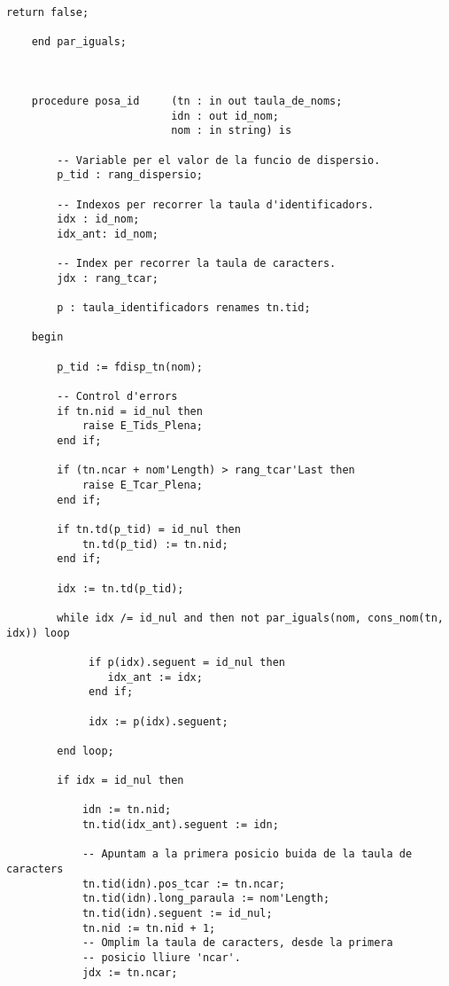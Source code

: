 \documentclass[10pt]{report}
\begin{document}
\begin{lstlisting}[style=Ada]
        return false;
    
    end par_iguals;
        


    procedure posa_id     (tn : in out taula_de_noms; 
                          idn : out id_nom; 
                          nom : in string) is
        
        -- Variable per el valor de la funcio de dispersio.
        p_tid : rang_dispersio;
        
        -- Indexos per recorrer la taula d'identificadors.
        idx : id_nom;
        idx_ant: id_nom; 
        
        -- Index per recorrer la taula de caracters.
        jdx : rang_tcar; 
        
        p : taula_identificadors renames tn.tid;
        
    begin
    
        p_tid := fdisp_tn(nom);
        
        -- Control d'errors
        if tn.nid = id_nul then
            raise E_Tids_Plena;
        end if;
        
        if (tn.ncar + nom'Length) > rang_tcar'Last then
            raise E_Tcar_Plena;
        end if;

        if tn.td(p_tid) = id_nul then
            tn.td(p_tid) := tn.nid;
        end if;
        
        idx := tn.td(p_tid);

        while idx /= id_nul and then not par_iguals(nom, cons_nom(tn, idx)) loop
             
             if p(idx).seguent = id_nul then
                idx_ant := idx;
             end if;
             
             idx := p(idx).seguent;     
            
        end loop;
        
        if idx = id_nul then

            idn := tn.nid;
            tn.tid(idx_ant).seguent := idn;
            
            -- Apuntam a la primera posicio buida de la taula de caracters
            tn.tid(idn).pos_tcar := tn.ncar; 
            tn.tid(idn).long_paraula := nom'Length;
            tn.tid(idn).seguent := id_nul;
            tn.nid := tn.nid + 1;
            -- Omplim la taula de caracters, desde la primera 
            -- posicio lliure 'ncar'.
            jdx := tn.ncar;
            

\end{lstlisting}
\end{document}
